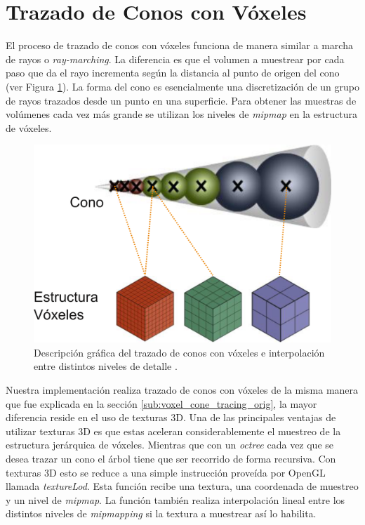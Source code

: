 \section{Trazado de Conos con Vóxeles} %

\label{sec:trazado_de_conos_con_voxeles}

El proceso de trazado de conos con vóxeles funciona de manera similar a marcha de rayos o \emph{ray-marching}. La diferencia es que el volumen a muestrear por cada paso que da el rayo incrementa según la distancia al punto de origen del cono (ver Figura \ref{fig:vct_explain}). La forma del cono es esencialmente una discretización de un grupo de rayos trazados desde un punto en una superficie. Para obtener las muestras de volúmenes cada vez más grande se utilizan los niveles de \emph{mipmap} en la estructura de vóxeles.

\begin{figure}
	\includegraphics[width=0.95\linewidth]{media/vct_explain.png}
	\caption{Descripción gráfica del trazado de conos con vóxeles e interpolación entre distintos niveles de detalle \cite{Oliver:2012:UEE:2341836.2341909}.}
	\label{fig:vct_explain}
\end{figure}

\noindent Nuestra implementación realiza trazado de conos con vóxeles de la misma manera que fue explicada en la sección \ref{sub:voxel_cone_tracing_orig}, la mayor diferencia reside en el uso de texturas 3D. Una de las principales ventajas de utilizar texturas 3D es que estas aceleran considerablemente el muestreo de la estructura jerárquica de vóxeles. Mientras que con un \emph{octree} cada vez que se desea trazar un cono el árbol tiene que ser recorrido de forma recursiva. Con texturas 3D esto se reduce a una simple instrucción proveída por OpenGL llamada \emph{textureLod}. Esta función recibe una textura, una coordenada de muestreo y un nivel de \emph{mipmap}. La función también realiza interpolación lineal entre los distintos niveles de \emph{mipmapping} si la textura a muestrear así lo habilita.
